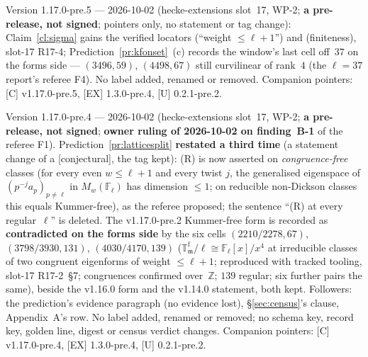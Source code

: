 \documentclass[11pt]{article}
\theoremstyle{remark}
\newcommand{\F}{\mathbb{F}}
\newcommand{\Z}{\mathbb{Z}}
\newcommand{\Fl}{\F_\ell}
\newcommand{\T}{\mathbb{T}}
\newcommand{\m}{\mathfrak{m}}
\newcommand{\CONJ}{\textsf{[conjectural]}}
\begin{document}
Version 1.17.0-pre.5 --- 2026-10-02 (hecke-extensions slot~17, WP-2; \textbf{a pre-release, not signed}; pointers only, no statement or tag change):
Claim~\ref{cl:sigma} gains the verified locators \cite[Thm.~4.1, p.~276]{jochnowitz} (``weight $\le\ell+1$'') and \cite[Thm.~2.2, p.~204]{ash_stevens}
(finiteness), slot-17 R17-4; Prediction~\ref{pr:kfonset}~(c) records the window's last cell off~$37$ on the forms side --- $(3496,59)$, $(4498,67)$ still
curvilinear of rank~$4$ (the $\ell=37$ report's referee F4). No label added, renamed or removed. Companion pointers: [C] v1.17.0-pre.5, [EX] 1.3.0-pre.4,
[U] 0.2.1-pre.2.

Version 1.17.0-pre.4 --- 2026-10-02 (hecke-extensions slot~17, WP-2; \textbf{a pre-release, not signed}; \textbf{owner ruling of 2026-10-02 on
finding~B-1} of the referee F1). Prediction~\ref{pr:latticesplit} \textbf{restated a third time} (a statement change of a \CONJ, the tag kept): (R) is now asserted
on \emph{congruence-free} classes (for every even $w\le\ell+1$ and every twist $j$, the generalised eigenspace of $(p^{-j}a_p)_{p\ne\ell}$ in $M_w(\Fl)$ has
dimension $\le1$; on reducible non-Dickson classes this equals Kummer-free), as the referee proposed; the sentence ``(R) at every regular~$\ell$'' is deleted. The
v1.17.0-pre.2 Kummer-free form is recorded as \textbf{contradicted on the forms side} by the six cells $(2210/2278,67)$, $(3798/3930,131)$, $(4030/4170,139)$
($\T^{\mathrm f}_\m/\ell\cong\Fl[x]/x^4$ at irreducible classes of two congruent eigenforms of weight $\le\ell+1$; reproduced with tracked tooling, slot-17
R17-2~\S7; congruences confirmed over~$\Z$; $139$ regular; six further pairs the same), beside the v1.16.0 form and the v1.14.0 statement, both kept. Followers:
the prediction's evidence paragraph (no evidence lost), \S\ref{sec:census}'s clause, Appendix~A's row. No label added, renamed or removed; no schema key, record
key, golden line, digest or census verdict changes. Companion pointers: [C] v1.17.0-pre.4, [EX] 1.3.0-pre.4, [U] 0.2.1-pre.2.
\end{document}
